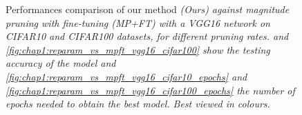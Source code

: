 \begin{figure}


  \caption{ Performances comparison of our method \em{(Ours)} against
    magnitude pruning with fine-tuning \em{(MP+FT)} with a VGG16 network on
    CIFAR10 and CIFAR100 datasets, for different pruning rates.
     and
    \cref{fig:chap1:reparam_vs_mpft_vgg16_cifar100} show the testing accuracy of
    the model and \cref{fig:chap1:reparam_vs_mpft_vgg16_cifar10_epochs} and
    \cref{fig:chap1:reparam_vs_mpft_vgg16_cifar100_epochs} the
    number of epochs needed to obtain the best model. Best viewed in colours.}
  \label{fig:chap1:reparam_vs_mpft_vgg16}
\end{figure}

